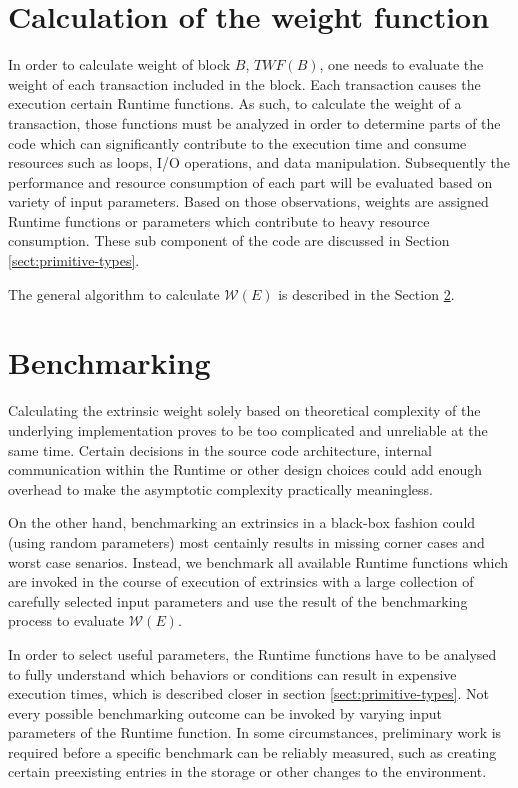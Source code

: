 \documentclass[11pt,a4paper]{article}
\newcommand{\TWF}{\ensuremath{\mathcal{W}}}
\begin{document}
\section{Calculation of the weight function}
\label{sec:runtime-primitives}
In order to calculate weight of block $B$, $TWF(B)$, one needs to evaluate the
weight of each transaction included in the block. Each transaction causes the
execution certain Runtime functions. As such, to calculate the weight of a
transaction, those functions must be analyzed in order to determine parts of the
code which can significantly contribute to the execution time and consume
resources such as  loops, I/O operations, and data manipulation. Subsequently
the performance and resource consumption of each part will be evaluated based on
variety of input parameters. Based on those observations, weights are assigned
Runtime functions or parameters which contribute to heavy resource consumption.
These sub component of the code are discussed in Section
\ref{sect:primitive-types}.
\newline

The general algorithm to calculate $\TWF(E)$ is described in the Section
\ref{sect:benchmarking}.

\section{Benchmarking}\label{sect:benchmarking} Calculating the extrinsic weight
solely based on theoretical complexity of the underlying implementation proves
to be too complicated and unreliable at the same time. Certain decisions in the
source code architecture, internal communication within the Runtime or other
design choices could add enough overhead to make the asymptotic complexity
practically meaningless.
\newline

On the other hand, benchmarking an extrinsics in a black-box fashion could
(using random parameters) most centainly results in missing corner cases and
worst case senarios. Instead, we benchmark all available Runtime functions which
are invoked in the course of execution of extrinsics with a large collection of
carefully selected input parameters and use the result of the benchmarking
process to evaluate $\TWF(E)$.
\newline

In order to select useful parameters, the Runtime functions have to be analysed
to fully understand which behaviors or conditions can result in expensive
execution times, which is described closer in section
\ref{sect:primitive-types}. Not every possible benchmarking outcome can be
invoked by varying input parameters of the Runtime function. In some
circumstances, preliminary work is required before a specific benchmark can be
reliably measured, such as creating certain preexisting entries in the storage
or other changes to the environment.
\newline
\end{document}
